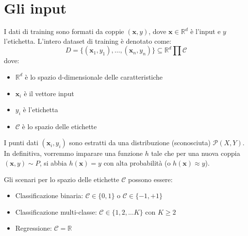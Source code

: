\documentclass[
	a4paper,
	11pt,
	oneside
]{book}
\theoremstyle{std}
\begin{document}
	\section{Gli input}
	\begin{definition}
		I dati di training sono formati da coppie $ (\textbf{x}, y) $, dove $ \textbf{x} \in \mathbb{R}^d $ è l'input e $ y $ l'etichetta. L'intero dataset di training è denotato come:
		$$
			D = \{(\textbf{x}_1, y_1), \ldots, (\textbf{x}_n, y_n)\} \subseteq \mathbb{R}^d \prod \mathcal{C}
		$$
		dove:
		\begin{itemize}
			\item $ \mathbb{R}^d $ è lo spazio d-dimensionale delle caratteristiche
			\item $ \textbf{x}_i $ è il vettore input
			\item $ y_i $ è l'etichetta
			\item $ \mathcal{C} $ è lo spazio delle etichette
		\end{itemize}
		I punti dati $ (\textbf{x}_i, y_i) $ sono estratti da una distribuzione (sconosciuta) $ \mathcal{P}(X, Y) $. \\
		In definitiva, vorremmo imparare una funzione $ h $ tale che per una nuova coppia $ (\textbf{x}, y) \sim P $, si abbia $ h(\textbf{x}) = y $ con alta probabilità (o $ h(\textbf{x}) \approx y $).
	\end{definition}
	Gli scenari per lo spazio delle etichette $ \mathcal{C} $ possono essere:
	\begin{itemize}
		\item Classificazione binaria: $ \mathcal{C} \in \{0, 1\} $ o $ \mathcal{C} \in \{-1, +1\} $
		\item Classificazione multi-classe: $ \mathcal{C} \in \{1, 2, \ldots K\} $ con $ K \geq 2 $
		\item Regressione: $ \mathcal{C} = \mathbb{R} $
	\end{itemize}
	
\end{document}
